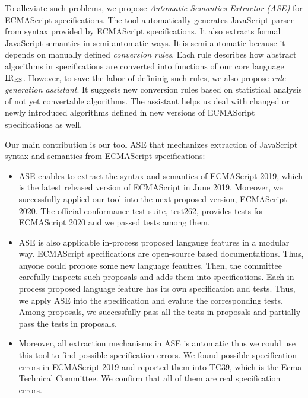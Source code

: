 To alleviate such problems, we propose \textit{Automatic Semantics Extractor (ASE)}
for ECMAScript specifications. The tool automatically generates JavaScript parser
from syntax provided by ECMAScript specifications. It also extracts formal
JavaScript semantics in semi-automatic ways. It is semi-automatic because
it depends on manually defined \textit{conversion rules}. Each rule describes how abstract
algorithms in specifications are converted into functions of our core language \( \text{IR}_\text{ES} \).
However, to save the labor of defininig such rules, we also propose \textit{rule generation assistant}.
It suggests new conversion rules based on statistical analysis of not yet convertable algorithms.
The assistant helps us deal with changed or newly introduced algorithms defined in new versions of
ECMAScript specifications as well.

Our main contribution is our tool ASE that mechanizes extraction of JavaScript syntax and semantics
from ECMAScript specifications:
\begin{itemize}
  \item ASE enables to extract the syntax and semantics of ECMAScript 2019,
    which is the latest released version of ECMAScript in June 2019.
    Moreover, we successfully applied our tool into the next proposed version,
    ECMAScript 2020. The official conformance test suite, test262, provides
     tests for ECMAScript 2020 and we passed  tests
    among them.
  \item ASE is also applicable in-process proposed langauge features in a modular way.
    ECMAScript specifications are open-source based documentations. Thus, anyone
    could propose some new language feautres. Then, the committee carefully inspects
    such proposals and adds them into specifications. Each in-process proposed language
    feature has its own specification and tests. Thus, we apply ASE into the specification
    and evalute the corresponding tests. Among  proposals, we successfully
    pass all the tests in  proposals and partially pass the tests in 
    proposals.
  \item Moreover, all extraction mechanisms in ASE is automatic thus we could use this tool
    to find possible specification errors. We found  possible specification errors
    in ECMAScript 2019 and reported them into TC39, which is the Ecma Technical Committee.
    We confirm that all of them are real specification errors.
\end{itemize}
